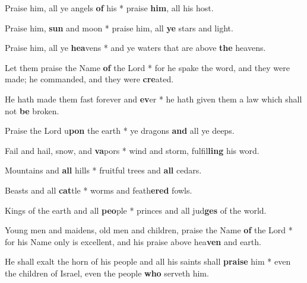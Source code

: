 \begin{multicols}{2}
	Praise him, all ye angels \textbf{of} his * praise \textbf{him}, all his host.
	
	Praise him, \textbf{sun} and moon * praise him, all \textbf{ye} stars and light.
	
	Praise him, all ye \textbf{hea}vens * and ye waters that are above \textbf{the} heavens.
	
	Let them praise the Name \textbf{of} the Lord * for he spake the word, and they were made; he commanded, and they were \textbf{cre}ated.
	
	He hath made them fast forever and \textbf{ev}er * he hath given them a law which shall not \textbf{be} broken.
	
	Praise the Lord u\textbf{pon} the earth * ye dragons \textbf{and} all ye deeps.
	
	Fail and hail, snow, and \textbf{va}pors * wind and storm, fulfil\textbf{ling} his word.
	
	Mountains and \textbf{all} hills * fruitful trees and \textbf{all} cedars.
	
	Beasts and all \textbf{cat}tle * worms and feath\textbf{ered} fowls.
	
	Kings of the earth and all \textbf{peo}ple * princes and all jud\textbf{ges} of the world.
	
	Young men and maidens, old men and children, praise the Name \textbf{of} the Lord * for his Name only is excellent, and his praise above hea\textbf{ven} and earth.
	
	He shall exalt the horn of his people and all his saints shall \textbf{praise} him * even the children of Israel, even the people \textbf{who} serveth him.
\end{multicols}